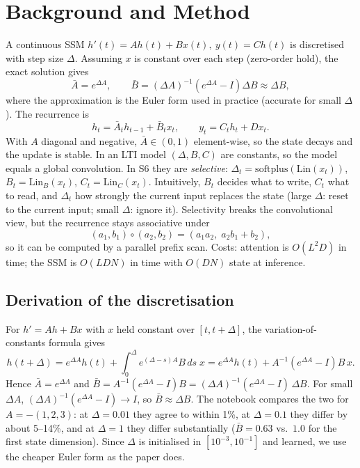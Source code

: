 \documentclass[10pt,twocolumn]{article}
\begin{document}
\section{Background and Method}
A continuous SSM $h'(t)=Ah(t)+Bx(t),\ y(t)=Ch(t)$ is discretised with step size $\Delta$. Assuming $x$ is constant over each step (zero-order hold), the exact solution gives
\begin{equation}
\bar A=e^{\Delta A},\qquad \bar B=(\Delta A)^{-1}\!\left(e^{\Delta A}-I\right)\Delta B\approx\Delta B,
\end{equation}
where the approximation is the Euler form used in practice (accurate for small $\Delta$). The recurrence is
\begin{equation}
h_t=\bar A_t h_{t-1}+\bar B_t x_t,\qquad y_t=C_t h_t+Dx_t .
\end{equation}
With $A$ diagonal and negative, $\bar A\in(0,1)$ element-wise, so the state decays and the update is stable. In an LTI model $(\Delta,B,C)$ are constants, so the model equals a global convolution. In S6 they are \emph{selective}: $\Delta_t=\mathrm{softplus}(\mathrm{Lin}(x_t))$, $B_t=\mathrm{Lin}_B(x_t)$, $C_t=\mathrm{Lin}_C(x_t)$. Intuitively, $B_t$ decides what to write, $C_t$ what to read, and $\Delta_t$ how strongly the current input replaces the state (large $\Delta$: reset to the current input; small $\Delta$: ignore it). Selectivity breaks the convolutional view, but the recurrence stays associative under
\begin{equation}
(a_1,b_1)\circ(a_2,b_2)=(a_1a_2,\;a_2b_1+b_2),
\label{eq:assoc}
\end{equation}
so it can be computed by a parallel prefix scan. Costs: attention is $O(L^2D)$ in time; the SSM is $O(LDN)$ in time with $O(DN)$ state at inference.


\subsection{Derivation of the discretisation}
For $h'=Ah+Bx$ with $x$ held constant over $[t,t{+}\Delta]$, the variation-of-constants formula gives
\begin{equation}
h(t{+}\Delta)=e^{\Delta A}h(t)+\int_0^{\Delta}e^{(\Delta-s)A}B\,ds\;x
=e^{\Delta A}h(t)+A^{-1}\!\left(e^{\Delta A}-I\right)B\,x .
\end{equation}
Hence $\bar A=e^{\Delta A}$ and $\bar B=A^{-1}(e^{\Delta A}-I)B=(\Delta A)^{-1}(e^{\Delta A}-I)\,\Delta B$. For small $\Delta A$, $(\Delta A)^{-1}(e^{\Delta A}-I)\to I$, so $\bar B\approx\Delta B$. The notebook compares the two for $A=-(1,2,3)$: at $\Delta{=}0.01$ they agree to within 1\%, at $\Delta{=}0.1$ they differ by about 5--14\%, and at $\Delta{=}1$ they differ substantially ($\bar B=0.63$ vs.\ $1.0$ for the first state dimension). Since $\Delta$ is initialised in $[10^{-3},10^{-1}]$ and learned, we use the cheaper Euler form as the paper does.
\end{document}
